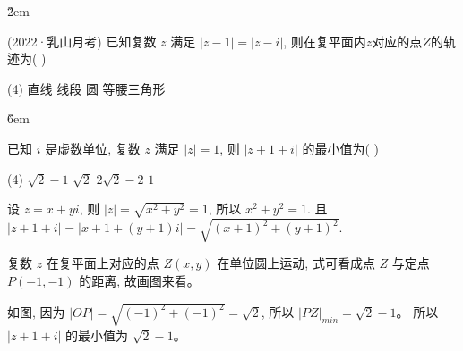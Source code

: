 \v{2em}

\begin{example}(2022·乳山月考)
    已知复数 $z$ 满足 $|z-1|=|z-i|$, 则在复平面内$z$对应的点$Z$的轨迹为( \quad )
    \begin{tasks}(4)
        \task 直线
        \task 线段
        \task 圆
        \task 等腰三角形
    \end{tasks}
\end{example}

\v{6em}

\begin{example}
    已知 $i$ 是虚数单位, 复数 $z$ 满足 $|z|=1$, 则 $|z+1+i|$ 的最小值为( \quad )
    \begin{tasks}(4)
        \task $\sqrt{2}-1$
        \task $\sqrt{2}$
        \task $2\sqrt{2}-2$
        \task $1$
    \end{tasks}
    \begin{solution}
        设 $z=x+yi$, 则 $|z|=\sqrt{x^{2}+y^{2}}=1$, 所以 $x^{2}+y^{2}=1$.
        且 $|z+1+i|=|x+1+(y+1)i|=\sqrt{(x+1)^{2}+(y+1)^{2}}$.

        复数 $z$ 在复平面上对应的点 $Z(x,y)$ 在单位圆上运动, 式可看成点 $Z$ 与定点 $P(-1,-1)$ 的距离, 故画图来看。
        \begin{center}
        \end{center}
        如图, 因为 $|OP|=\sqrt{(-1)^{2}+(-1)^{2}}=\sqrt{2}$, 所以 $|PZ|_{min}=\sqrt{2}-1$。
        所以 $|z+1+i|$ 的最小值为 $\sqrt{2}-1$。
    \end{solution}
\end{example}

